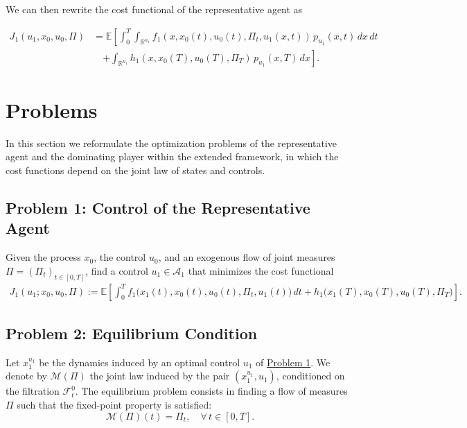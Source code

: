 \documentclass[12pt]{article}
\theoremstyle{definition}
\begin{document}
\medskip

\noindent
We can then rewrite the cost functional of the representative agent as

\begin{align*}
    J_1(u_1, x_0, u_0,\Pi)
    &= \mathbb{E}\!\left[ \int_0^T\!\int_{\mathbb{R}^{n_1}}
    f_1\!\left(x, x_0(t), u_0(t), \Pi_t, u_1(x,t)\right)\,p_{u_1}(x,t)\,dx\,dt\right.\\
    &\quad\left.+ \int_{\mathbb{R}^{n_1}}
    h_1\!\left(x, x_0(T), u_0(T), \Pi_T\right)\,p_{u_1}(x,T)\,dx \right].
\end{align*}

\section{Problems}

In this section we reformulate the optimization problems of the representative agent and the dominating player within the extended framework, in which the cost functions depend on the joint law of states and controls.

\subsection{Problem 1: Control of the Representative Agent}
\label{Problem1}
Given the process \(x_0\), the control $u_0$, and an exogenous flow of joint measures \(\Pi=(\Pi_t)_{t\in[0,T]}\), find a control \(u_1 \in \mathcal{A}_1\) that minimizes the cost functional
\begin{equation}
    \label{Problem 21}
    \begin{aligned}
    J_1(u_1; x_0, u_0, \Pi)
    := \mathbb{E}\left[\int_0^T f_1\big(x_1(t), x_0(t), u_0(t), \Pi_t, u_1(t)\big)\,dt
    + h_1\big(x_1(T),x_0(T), u_0(T), \Pi_T\big)\right].
    \end{aligned}
\end{equation}

\subsection{Problem 2: Equilibrium Condition}
\label{Problem2}
Let \(x_1^{u_1}\) be the dynamics induced by an optimal control \(u_1\) of \hyperref[Problem1]{Problem 1}. We denote by \(\mathcal{M}(\Pi)\) the joint law induced by the pair \((x_1^{u_1},u_1)\), conditioned on the filtration \(\mathcal{F}^0_t\). The equilibrium problem consists in finding a flow of measures \(\Pi\) such that the fixed-point property is satisfied:
\[
\mathcal{M}(\Pi)(t) = \Pi_t, \quad \forall\,t\in[0,T].
\]
\end{document}

